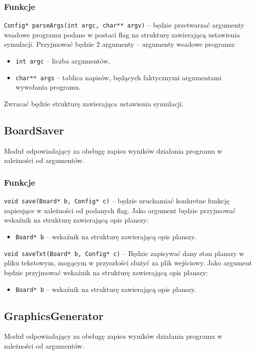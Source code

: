 \documentclass{mwart}
\begin{document}
\subsubsection{Funkcje}
\texttt{Config* parseArgs(int argc, char** argv)} -- będzie przetwarzać argumenty wsadowe programu podane w postaci flag na strukturę zawierającą ustawienia symulacji. Przyjmować będzie 2 argumenty -- argumenty wsadowe programu:
\begin{itemize}[label={}]
	\item \texttt{int argc} -- liczba argumentów,
	\item \texttt{char** args} -- tablica napisów, będących faktycznymi argumentami wywołania programu.
\end{itemize}

Zwracać będzie strukturę zawierająca ustawienia symulacji.

\subsection{BoardSaver}
Moduł odpowiadający za obsługę zapisu wyników działania programu w zależności od argumentów.

\subsubsection{Funkcje}
\texttt{void save(Board* b, Config* c)} -- będzie uruchamiać konkretne funkcję zapisujące w zależności od podanych flag. Jako argument będzie przyjmować wskaźnik na strukturę zawierającą opis planszy:
\begin{itemize}[label={}]
	\item \texttt{Board* b} -- wskaźnik na strukturę zawierającą opis planszy.
\end{itemize}

\noindent{}\texttt{void saveTxt(Board* b, Config* c)} -- Będzie zapisywać dany stan planszy w pliku tekstowym, mogącym w przyszłości służyć za plik wejściowy. Jako argument będzie przyjmować wskaźnik na strukturę zawierającą opis planszy:
\begin{itemize}[label={}]
	\item \texttt{Board* b} -- wskaźnik na strukturę zawierającą opis planszy.
\end{itemize}

\subsection{GraphicsGenerator}
Moduł odpowiadający za obsługę zapisu wyników działania programu w zależności od argumentów.
\end{document}
